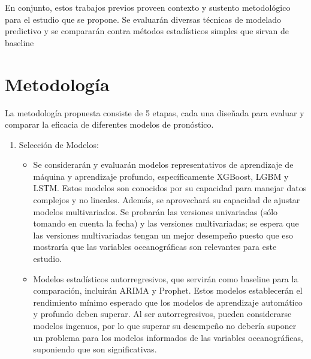 \documentclass[twoside,11pt]{article}
\begin{document}
En conjunto, estos trabajos previos proveen contexto y sustento metodológico para el estudio que se propone. Se evaluarán diversas técnicas de modelado predictivo y se compararán contra métodos estadísticos simples que sirvan de baseline


\section{Metodología}

La metodología propuesta consiste de 5 etapas, cada una diseñada para evaluar y comparar la eficacia de diferentes modelos de pronóstico.

\begin{enumerate}
\item Selección de Modelos:

\begin{itemize}
    \item Se considerarán y evaluarán modelos representativos de aprendizaje de máquina y aprendizaje profundo, específicamente XGBoost, LGBM y LSTM. Estos modelos son conocidos por su capacidad para manejar datos complejos y no lineales. Además, se aprovechará su capacidad de ajustar modelos multivariados. Se probarán las versiones univariadas (sólo tomando en cuenta la fecha) y las versiones multivariadas; se espera que las versiones multivariadas tengan un mejor desempeño puesto que eso mostraría que las variables oceanográficas son relevantes para este estudio.
    \item Modelos estadísticos autorregresivos, que servirán como baseline para la comparación, incluirán ARIMA y Prophet. Estos modelos establecerán el rendimiento mínimo esperado que los modelos de aprendizaje automático y profundo deben superar. Al ser autorregresivos, pueden considerarse modelos ingenuos, por lo que superar su desempeño no debería suponer un problema para los modelos informados de las variables oceanográficas, suponiendo que son significativas. 
\end{itemize}


\end{enumerate}
\end{document}
